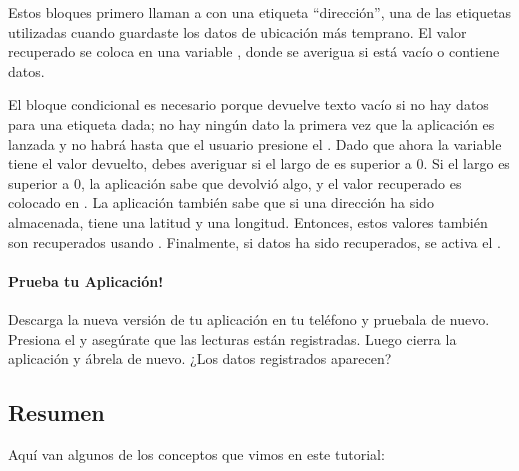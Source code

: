 Estos bloques primero llaman a  con una
etiqueta ``dirección'', una de las etiquetas utilizadas cuando
guardaste los datos de ubicación más temprano. El valor recuperado se
coloca en una variable , donde se averigua
si está vacío o contiene datos.

El bloque condicional es necesario porque  devuelve
texto vacío si no hay datos para una etiqueta dada; no hay ningún
dato la primera vez que la aplicación es lanzada y no habrá hasta
que el usuario presione el . Dado que ahora
la variable  tiene el valor devuelto,
debes averiguar si el largo de  es
superior a 0. Si el largo es superior a 0, la aplicación sabe que
 devolvió algo, y el valor recuperado es colocado en
. La aplicación también sabe
que si una dirección ha sido almacenada, tiene una latitud y una
longitud. Entonces, estos valores también son recuperados usando
. Finalmente, si datos ha sido recuperados,
se activa el .

\paragraph{Prueba tu Aplicación!} Descarga la nueva versión de tu
aplicación en tu teléfono y pruebala de nuevo. Presiona el
 y asegúrate que las lecturas están
registradas. Luego cierra la aplicación y ábrela de nuevo. ¿Los datos
registrados aparecen?

\subsection*{Resumen}

Aquí van algunos de los conceptos que vimos en este tutorial:

